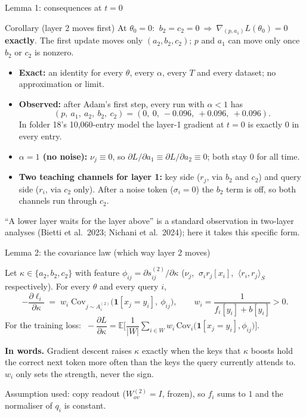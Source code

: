 \documentclass[aspectratio=169,11pt]{beamer}
\newcommand{\1}{\mathbf{1}}
\begin{document}
\begin{frame}{Lemma 1: consequences at $t=0$}
\small
\begin{block}{Corollary (layer 2 moves first)}
At $\theta_0=0$: $\ b_2=c_2=0\ \Rightarrow\ \nabla_{(p,a_1)}L(\theta_0)=0$ \textbf{exactly}. The first update moves only $(a_2,b_2,c_2)$;
$p$ and $a_1$ can move only once $b_2$ or $c_2$ is nonzero.
\end{block}
\begin{itemize}
\item \textbf{Exact:} an identity for every $\theta$, every $\alpha$, every $T$ and every dataset; no approximation or limit.
\item \textbf{Observed:} after Adam's first step, every run with $\alpha<1$ has
\[
(p,\ a_1,\ a_2,\ b_2,\ c_2)=(0,\ 0,\ -0.096,\ +0.096,\ +0.096).
\]
In folder 18's 10{,}060-entry model the layer-1 gradient at $t=0$ is exactly $0$ in every entry.
\item \textbf{$\alpha=1$ (no noise):} $\nu_j\equiv0$, so $\partial L/\partial a_1\equiv\partial L/\partial a_2\equiv0$; both stay $0$ for all time.
\item \textbf{Two teaching channels for layer 1:} key side ($r_j$, via $b_2$ and $c_2$) and query side ($r_i$, via $c_2$ only).
After a noise token ($\sigma_i=0$) the $b_2$ term is off, so both channels run through $c_2$.
\end{itemize}
\vspace{0.3em}
{\footnotesize\color{gray}``A lower layer waits for the layer above'' is a standard observation in two-layer analyses
(Bietti et al.\ 2023; Nichani et al.\ 2024); here it takes this specific form.}
\end{frame}


\begin{frame}{Lemma 2: the covariance law (which way layer 2 moves)}
\small
\begin{lemma}
Let $\kappa\in\{a_2,b_2,c_2\}$ with feature $\phi_{ij}=\partial s^{(2)}_{ij}/\partial\kappa$
($\nu_j$, $\ \sigma_i r_j[x_i]$, $\ \langle r_i,r_j\rangle_S$ respectively). For every $\theta$ and every query $i$,
\[
-\frac{\partial\ell_i}{\partial\kappa}\;=\;w_i\;\mathrm{Cov}_{j\sim A^{(2)}_i}\big(\1[x_j=y_i],\ \phi_{ij}\big),
\qquad w_i=\frac{1}{f_i[y_i]+b[y_i]}>0 .
\]
For the training loss: $\ -\dfrac{\partial L}{\partial\kappa}=\mathbb E\Big[\dfrac1{|W|}\sum_{i\in W}w_i\,\mathrm{Cov}_i\big(\1[x_j=y_i],\phi_{ij}\big)\Big]$.
\end{lemma}
\vspace{0.3em}
\textbf{In words.} Gradient descent raises $\kappa$ exactly when the keys that $\kappa$ boosts hold the correct next token
more often than the keys the query currently attends to. $w_i$ only sets the strength, never the sign.
\vspace{0.3em}

{\footnotesize\color{gray}Assumption used: copy readout ($W^{(2)}_{ov}=I$, frozen), so $f_i$ sums to $1$ and the normaliser of $q_i$ is constant.}
\end{frame}
\end{document}

